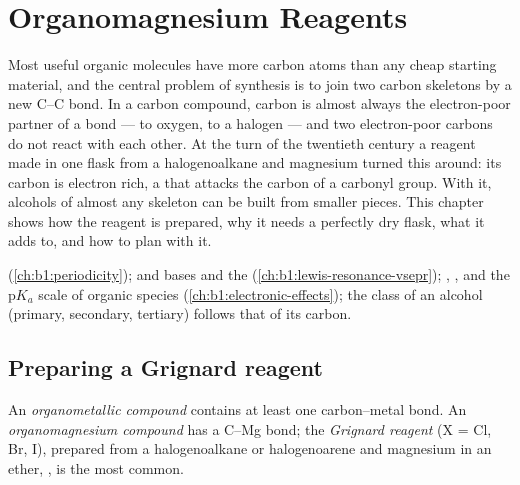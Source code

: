 \chapter{Organomagnesium Reagents}\label{ch:b1:organomagnesium}

Most useful organic molecules have more carbon atoms than any cheap
starting material, and the central problem of synthesis is to join two
carbon skeletons by a new C--C bond. In a carbon compound, carbon is
almost always the electron-poor partner of a bond --- to oxygen, to a
halogen --- and two electron-poor carbons do not react with each other.
At the turn of the twentieth century a reagent made in one flask from a
halogenoalkane and magnesium turned this around: its carbon is electron
rich, a  that attacks the carbon of a carbonyl group. With it,
alcohols of almost any skeleton can be built from smaller pieces. This
chapter shows how the reagent is prepared, why it needs a perfectly dry
flask, what it adds to, and how to plan with it.

\begin{recall}
 (\cref{ch:b1:periodicity});  and bases and
the  (\cref{ch:b1:lewis-resonance-vsepr}); ,
,  and the $\mathrm{p}K_a$ scale of organic
species (\cref{ch:b1:electronic-effects}); the class of an alcohol
(primary, secondary, tertiary) follows that of its carbon.
\end{recall}

\section{Preparing a Grignard reagent}

\begin{definition}\label{def:b1:organomagnesium:organometallic}
An \emph{organometallic compound} contains
at least one carbon--metal bond. An \emph{organomagnesium
compound} has a C--Mg bond; the
\emph{Grignard reagent}  (X = Cl, Br, I),
prepared from a halogenoalkane or halogenoarene and magnesium in an ether,
, is the most common.
\end{definition}

